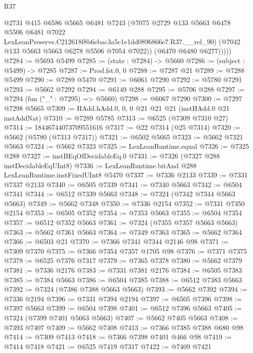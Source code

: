 \begin{lexlean}{R37}
\begin{coremodule}
              @2731
              @415
              @6586
              @5665
              @6481
              @7243
              (@7075
                @2729
                @133
                @5663
                @6478
                @5506
                @6481
                @7022
                LexLeanPreserve.C212618f8b6ebac3a5c1e1dd0896866e7.R37.__rel_90)
              (@7042 @133 @5663 @5663 @6278 @5506 @7054 @7022))
            (@6470 @6480 @6277)))))
@7284 := @5693 @5499
@7285 := (state : @7284) -> @5660
@7286 := (subject : @5499) -> @7285
@7287 := Prod.fst.{0, 0}
@7288 := @7287 @21
@7289 := @7288 @5499
@7290 := @7289 @5470
@7291 := @6061 @7290
@7292 := @5780 @7291
@7293 := @5662 @7292
@7294 := @6149 @288
@7295 := @5706 @288
@7297 := @7294 (fun ("_" : @7295) => @5660)
@7298 := @6067 @7290
@7300 := @7297 @7298 @5665
@7309 := HAdd.hAdd.{0, 0, 0} @21 @21 @21 (instHAdd.{0} @21 instAddNat)
@7310 := @7289 @5785
@7313 := @6525 (@7309 @7310 @27)
@7314 := 18446744073709551616
@7317 := @22 @7314 (@25 @7314)
@7320 := @5662 (@5780 (@7313 @7317))
@7321 := @6502 @5665
@7323 := @5662 @7321 @5663
@7324 := @5662 @7323
@7325 := LexLeanRuntime.equal
@7326 := @7325 @288
@7327 := instBEqOfDecidableEq.{0}
@7331 := @7326 (@7327 @288 instDecidableEqUInt8)
@7336 := LexLeanRuntime.bitAnd @288 LexLeanRuntime.instFixedUInt8 @5470
@7337 := @7336 @2133
@7339 := @7331 @7337 @2133
@7340 := @6505 @7339
@7341 := @7340 @5663
@7342 := @6504 @7341
@7344 := @6512 @7339 @5663
@7348 := @7324 (@7342 @7344 @5663 @5663)
@7349 := @5662 @7348
@7350 := @7336 @2154
@7352 := @7331 @7350 @2154
@7353 := @6505 @7352
@7354 := @7353 @5663
@7355 := @6504 @7354
@7357 := @6512 @7352 @5663
@7361 := @7324 (@7355 @7357 @5663 @5663)
@7363 := @5662 @7361 @5663
@7364 := @7349 @7363
@7365 := @5662 @7364
@7366 := @6503 @21
@7370 := @7366 @7341 @7344 @2146 @98
@7371 := @7309 @7370
@7375 := @7366 @7354 @7357 @1705 @98
@7376 := @7371 @7375
@7378 := @6525 @7376 @7317
@7379 := @7365 @7378
@7380 := @5662 @7379
@7381 := @7336 @2176
@7383 := @7331 @7381 @2176
@7384 := @6505 @7383
@7385 := @7384 @5663
@7386 := @6504 @7385
@7388 := @6512 @7383 @5663
@7392 := @7324 (@7386 @7388 @5663 @5663)
@7393 := @5662 @7392
@7394 := @7336 @2194
@7396 := @7331 @7394 @2194
@7397 := @6505 @7396
@7398 := @7397 @5663
@7399 := @6504 @7398
@7401 := @6512 @7396 @5663
@7405 := @7324 (@7399 @7401 @5663 @5663)
@7407 := @5662 @7405 @5663
@7408 := @7393 @7407
@7409 := @5662 @7408
@7413 := @7366 @7385 @7388 @680 @98
@7414 := @7309 @7413
@7418 := @7366 @7398 @7401 @466 @98
@7419 := @7414 @7418
@7421 := @6525 @7419 @7317
@7422 := @7409 @7421

\end{coremodule}
\end{lexlean}
